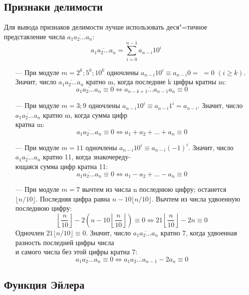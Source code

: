 \subsection{Признаки делимости}

Для вывода признаков делимости лучше использовать {\ital деся"=тичное представление} числа $\overline{a_1a_2\dots a_n}$:
$$\overline{a_1a_2\dots a_n}=\sum^{n-1}_{i=0}a_{n-i}10^i$$

\begin{itemize}
\item[---]При модуле $m=2^k; 5^k; 10^k$ одночлены $a_{n-i}10^i\equiv a_{n-i}0=$ $=0$
$(i\geq k)$. Значит, число $\overline{a_1a_2\dots a_n}$ кратно {\ital m}, когда
последние {\ital k} цифры кратны {\ital m}:
$$\overline{a_1a_2\dots a_n}\equiv 0\iff
\overline{a_{n-k+1}\dots a_{n-1}a_n}\equiv 0$$

\item[---]При модуле $m=3; 9$ одночлены $a_{n-i}10^i\equiv a_{n-i}1^i=a_{n-i}$.
Значит, число $\overline{a_1a_2\dots a_n}$ кратно {\ital m}, когда сумма цифр\\
кратна {\ital m}:
$$\overline{a_1a_2\dots a_n}\equiv 0\iff
a_1+a_2+\dots+a_n\equiv 0$$

\item[---]При модуле $m=11$ одночлены $a_{n-i}10^i\equiv a_{n-i}(-1)^i$.
Значит, число $\overline{a_1a_2\dots a_n}$ кратно 11, когда знакочереду-\\ющаяся
сумма цифр кратна 11:
$$\overline{a_1a_2\dots a_n}\equiv 0\iff
a_1-a_2+\dots-a_n\equiv 0$$

\item[---]При модуле $m=7$ вычтем из числа {\ital n} последнюю цифру; останется
$\lfloor n/10\rfloor$. Последняя цифра равна $n-10\lfloor n/10\rfloor$.
Вычтем из числа удвоенную последнюю цифру:
$$\left\lfloor\frac{n}{10}\right\rfloor -2(n-10\left\lfloor\frac{n}{10}
\right\rfloor)\equiv 0\iff 21\left\lfloor\frac{n}{10}\right\rfloor-2n\equiv 0$$
Одночлен $21\lfloor n/10\rfloor\equiv 0$. Значит, число $\overline{a_1a_2\dots a_n}$
кратно 7, когда удвоенная разность последней цифры числа\\
и самого числа без этой цифры кратна 7:
$$\overline{a_1a_2\dots a_n}\equiv 0\iff\overline{a_1a_2\dots a_{n-1}}-2a_n\equiv 0$$
\end{itemize}

\subsection{Функция Эйлера}

